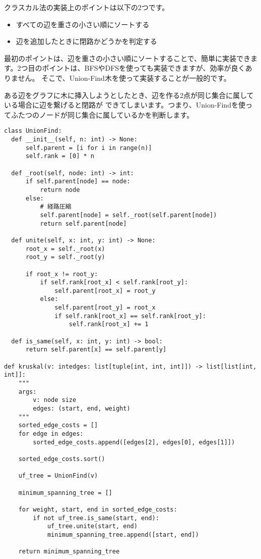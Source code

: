 \vspace{0.5cm}

クラスカル法の実装上のポイントは以下の2つです。

\begin{itemize}
  \item すべての辺を重さの小さい順にソートする
  \item 辺を追加したときに閉路かどうかを判定する
\end{itemize}

最初のポイントは、辺を重さの小さい順にソートすることで、簡単に実装できます。2つ目のポイントは、BFSやDFSを使っても実装できますが、効率が良くありません。
そこで、Union-Find木を使って実装することが一般的です。

ある辺をグラフに木に挿入しようとしたとき、辺を作る2点が同じ集合に属している場合に辺を繋げると閉路が
できてしまいます。つまり、Union-Findを使ってふたつのノードが同じ集合に属しているかを判断します。

\begin{lstlisting}[caption=クラスカル法の実装, label=kruskal, frame=TRBL, label={kruskal}]
class UnionFind:
  def __init__(self, n: int) -> None:
      self.parent = [i for i in range(n)]
      self.rank = [0] * n
  
  def _root(self, node: int) -> int:
      if self.parent[node] == node:
          return node
      else:
          # 経路圧縮
          self.parent[node] = self._root(self.parent[node])
          return self.parent[node]
  
  def unite(self, x: int, y: int) -> None:
      root_x = self._root(x)
      root_y = self._root(y)
      
      if root_x != root_y:
          if self.rank[root_x] < self.rank[root_y]:
              self.parent[root_x] = root_y
          else:
              self.parent[root_y] = root_x
              if self.rank[root_x] == self.rank[root_y]:
                  self.rank[root_x] += 1

  def is_same(self, x: int, y: int) -> bool:
      return self.parent[x] == self.parent[y]

def kruskal(v: intedges: list[tuple[int, int, int]]) -> list[list[int, int]]:
    """
    args:
        v: node size
        edges: (start, end, weight)
    """
    sorted_edge_costs = []
    for edge in edges:
        sorted_edge_costs.append([edges[2], edges[0], edges[1]])
    
    sorted_edge_costs.sort()
    
    uf_tree = UnionFind(v)
    
    minimum_spanning_tree = []
    
    for weight, start, end in sorted_edge_costs:
        if not uf_tree.is_same(start, end):
            uf_tree.unite(start, end)
            minimum_spanning_tree.append([start, end])
    
    return minimum_spanning_tree
\end{lstlisting}

